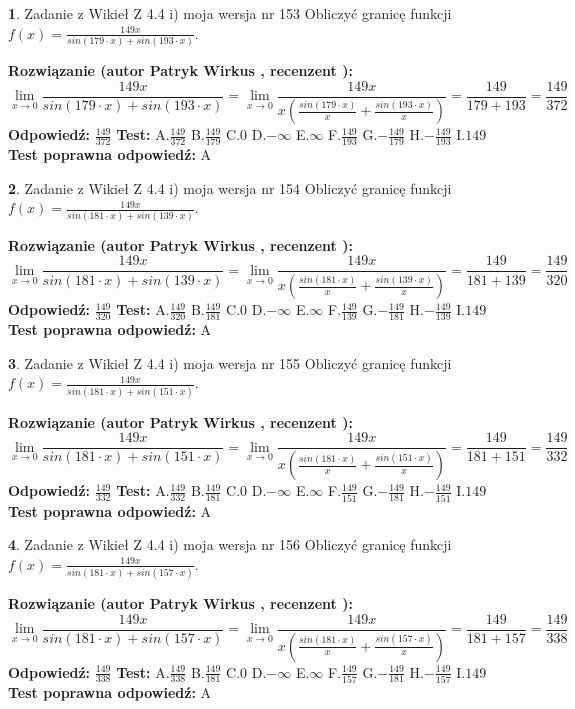 \documentclass[12pt, a4paper]{article}
\theoremstyle{definition} %
\newtheorem{zad}{}
\newcommand{\zadStart}[1]{\begin{zad}#1\newline}
\newcommand{\zadStop}{\end{zad}}
\newcommand{\rozwStart}[2]{\noindent \textbf{Rozwiązanie (autor #1 , recenzent #2): }\newline}
\newcommand{\rozwStop}{\newline}
\newcommand{\odpStart}{\noindent \textbf{Odpowiedź:}\newline}
\newcommand{\odpStop}{\newline}
\newcommand{\testStart}{\noindent \textbf{Test:}\newline}
\newcommand{\testStop}{\newline}
\newcommand{\kluczStart}{\noindent \textbf{Test poprawna odpowiedź:}\newline}
\newcommand{\kluczStop}{\newline}
\begin{document}
\zadStart{Zadanie z Wikieł Z 4.4 i) moja wersja nr 153}
Obliczyć granicę funkcji $f(x)=\frac{149x}{sin(179\cdot x) +sin(193\cdot x)}$.
\zadStop
\rozwStart{Patryk Wirkus}{}
$$\lim\limits_{x\to 0}\frac{149x}{sin(179\cdot x) +sin(193\cdot x)}=\lim\limits_{x\to 0}\frac{149x}{x(\frac{sin(179\cdot x)}{x}+\frac{sin(193\cdot x)}{x})}=\frac{149}{179+193} = \frac{149}{372}$$
\rozwStop
\odpStart
$\frac{149}{372}$
\odpStop
\testStart
A.$\frac{149}{372}$
B.$\frac{149}{179}$
C.$0$
D.$-\infty$
E.$\infty$
F.$\frac{149}{193}$
G.$-\frac{149}{179}$
H.$-\frac{149}{193}$
I.$149$
\testStop
\kluczStart
A
\kluczStop



\zadStart{Zadanie z Wikieł Z 4.4 i) moja wersja nr 154}
Obliczyć granicę funkcji $f(x)=\frac{149x}{sin(181\cdot x) +sin(139\cdot x)}$.
\zadStop
\rozwStart{Patryk Wirkus}{}
$$\lim\limits_{x\to 0}\frac{149x}{sin(181\cdot x) +sin(139\cdot x)}=\lim\limits_{x\to 0}\frac{149x}{x(\frac{sin(181\cdot x)}{x}+\frac{sin(139\cdot x)}{x})}=\frac{149}{181+139} = \frac{149}{320}$$
\rozwStop
\odpStart
$\frac{149}{320}$
\odpStop
\testStart
A.$\frac{149}{320}$
B.$\frac{149}{181}$
C.$0$
D.$-\infty$
E.$\infty$
F.$\frac{149}{139}$
G.$-\frac{149}{181}$
H.$-\frac{149}{139}$
I.$149$
\testStop
\kluczStart
A
\kluczStop



\zadStart{Zadanie z Wikieł Z 4.4 i) moja wersja nr 155}
Obliczyć granicę funkcji $f(x)=\frac{149x}{sin(181\cdot x) +sin(151\cdot x)}$.
\zadStop
\rozwStart{Patryk Wirkus}{}
$$\lim\limits_{x\to 0}\frac{149x}{sin(181\cdot x) +sin(151\cdot x)}=\lim\limits_{x\to 0}\frac{149x}{x(\frac{sin(181\cdot x)}{x}+\frac{sin(151\cdot x)}{x})}=\frac{149}{181+151} = \frac{149}{332}$$
\rozwStop
\odpStart
$\frac{149}{332}$
\odpStop
\testStart
A.$\frac{149}{332}$
B.$\frac{149}{181}$
C.$0$
D.$-\infty$
E.$\infty$
F.$\frac{149}{151}$
G.$-\frac{149}{181}$
H.$-\frac{149}{151}$
I.$149$
\testStop
\kluczStart
A
\kluczStop



\zadStart{Zadanie z Wikieł Z 4.4 i) moja wersja nr 156}
Obliczyć granicę funkcji $f(x)=\frac{149x}{sin(181\cdot x) +sin(157\cdot x)}$.
\zadStop
\rozwStart{Patryk Wirkus}{}
$$\lim\limits_{x\to 0}\frac{149x}{sin(181\cdot x) +sin(157\cdot x)}=\lim\limits_{x\to 0}\frac{149x}{x(\frac{sin(181\cdot x)}{x}+\frac{sin(157\cdot x)}{x})}=\frac{149}{181+157} = \frac{149}{338}$$
\rozwStop
\odpStart
$\frac{149}{338}$
\odpStop
\testStart
A.$\frac{149}{338}$
B.$\frac{149}{181}$
C.$0$
D.$-\infty$
E.$\infty$
F.$\frac{149}{157}$
G.$-\frac{149}{181}$
H.$-\frac{149}{157}$
I.$149$
\testStop
\kluczStart
A
\kluczStop
\end{document}
